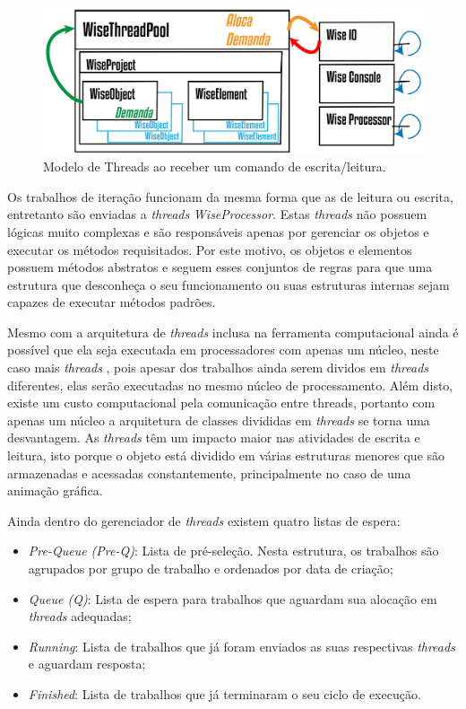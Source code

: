\begin{figure}[!htbp]
	\centering
	\includegraphics[width=\linewidth]{Figures/WiseThreadPoolHeating@16x.png}
	\caption{Modelo de Threads ao receber um comando de escrita/leitura.}
	\label{fig9:threads}
\end{figure}

Os trabalhos de iteração funcionam da mesma forma que as de leitura ou escrita, entretanto são enviadas a \textit{threads} \textit{WiseProcessor}. Estas \textit{threads} não possuem lógicas muito complexas e são responsáveis apenas por gerenciar os objetos e executar os métodos requisitados. Por este motivo, os objetos e elementos possuem métodos abstratos e seguem esses conjuntos de regras para que uma estrutura que desconheça o seu funcionamento ou suas estruturas internas sejam capazes de executar métodos padrões. 

Mesmo com a arquitetura de \textit{threads} inclusa na ferramenta computacional ainda é possível que ela seja executada em processadores com apenas um núcleo, neste caso mais \textit{threads} , pois apesar dos trabalhos ainda serem dividos em \textit{threads} diferentes, elas serão executadas no mesmo núcleo de processamento. Além disto, existe um custo computacional pela comunicação entre threads, portanto com apenas um núcleo a arquitetura de classes divididas em \textit{threads} se torna uma desvantagem. As \textit{threads} têm um impacto maior nas atividades de escrita e leitura, isto porque o objeto está dividido em várias estruturas menores que são armazenadas e acessadas constantemente, principalmente no caso de uma animação gráfica.

Ainda dentro do gerenciador de \textit{threads} existem quatro listas de espera:

\begin{itemize}
	\item \textit{Pre-Queue (Pre-Q)}: Lista de pré-seleção. Nesta estrutura, os trabalhos são agrupados por grupo de trabalho e ordenados por data de criação;
	\item \textit{Queue (Q)}: Lista de espera para trabalhos que aguardam sua alocação em \textit{threads} adequadas;
	\item \textit{Running}: Lista de trabalhos que já foram enviados as suas respectivas \textit{threads} e aguardam resposta;
	\item \textit{Finished}: Lista de trabalhos que já terminaram o seu ciclo de execução.
\end{itemize}

